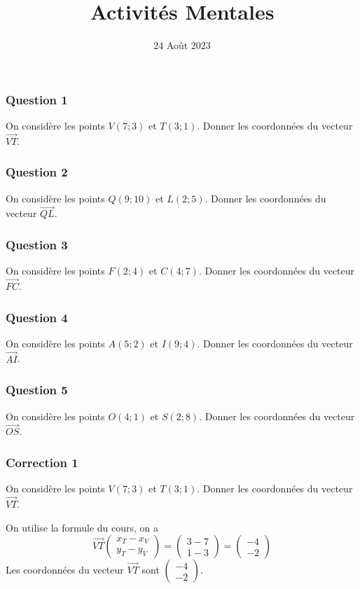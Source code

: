 \documentclass[15pt, mathserif]{beamer}
\title{Activités Mentales}
\date{24 Août 2023}
\begin{document}
\begin{frame}
    \titlepage
\end{frame}

\begin{frame} 
	\frametitle{Question 1}
On considère les points $V(7;3)$ et $T(3;1)$. Donner les coordonnées du vecteur $ \overrightarrow{VT}$.\end{frame}


\begin{frame} 
	\frametitle{Question 2}
On considère les points $Q(9;10)$ et $L(2;5)$. Donner les coordonnées du vecteur $ \overrightarrow{QL}$.\end{frame}


\begin{frame} 
	\frametitle{Question 3}
On considère les points $F(2;4)$ et $C(4;7)$. Donner les coordonnées du vecteur $ \overrightarrow{FC}$.\end{frame}


\begin{frame} 
	\frametitle{Question 4}
On considère les points $A(5;2)$ et $I(9;4)$. Donner les coordonnées du vecteur $ \overrightarrow{AI}$.\end{frame}


\begin{frame} 
	\frametitle{Question 5}
On considère les points $O(4;1)$ et $S(2;8)$. Donner les coordonnées du vecteur $ \overrightarrow{OS}$.\end{frame}


\begin{frame}
\vspace{-10mm}
	\frametitle{Correction 1}
On considère les points $V(7;3)$ et $T(3;1)$. Donner les coordonnées du vecteur $ \overrightarrow{VT}$. 
 
 On utilise la formule du cours, on a 
 $$\overrightarrow{ VT}\begin{pmatrix} x_{T}-x_{V} \\ y_{T}-y_{V} \end{pmatrix}=\begin{pmatrix} 3-7\\ 1-3\end{pmatrix}=\begin{pmatrix} -4\\ -2\end{pmatrix}$$ Les coordonnées du vecteur $\overrightarrow{VT}$ sont $\begin{pmatrix} -4\\ -2\end{pmatrix}$.\end{frame}
\end{document}
